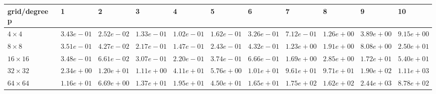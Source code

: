 \begin{tabular}{lllllllllll}
\hline
 grid/degree p   & 1          & 2          & 3          & 4          & 5          & 6          & 7          & 8          & 9          & 10         \\
\hline
 $4 \times 4$    & $3.43e-01$ & $2.52e-02$ & $1.33e-01$ & $1.02e-01$ & $1.62e-01$ & $3.26e-01$ & $7.12e-01$ & $1.26e+00$ & $3.89e+00$ & $9.15e+00$ \\
 $8 \times 8$    & $3.51e-01$ & $4.27e-02$ & $2.17e-01$ & $1.47e-01$ & $2.43e-01$ & $4.32e-01$ & $1.23e+00$ & $1.91e+00$ & $8.08e+00$ & $2.50e+01$ \\
 $16 \times 16$  & $3.48e-01$ & $6.61e-02$ & $3.07e-01$ & $2.20e-01$ & $3.74e-01$ & $6.66e-01$ & $1.69e+00$ & $2.85e+00$ & $1.72e+01$ & $5.40e+01$ \\
 $32 \times 32$  & $2.34e+00$ & $1.20e+01$ & $1.11e+00$ & $4.11e+01$ & $5.76e+00$ & $1.01e+01$ & $9.61e+01$ & $9.71e+01$ & $1.90e+02$ & $1.11e+03$ \\
 $64 \times 64$  & $1.16e+01$ & $6.69e+00$ & $1.37e+01$ & $1.95e+01$ & $4.50e+01$ & $1.65e+01$ & $1.75e+02$ & $1.62e+02$ & $2.44e+03$ & $8.78e+02$ \\
\hline
\end{tabular}